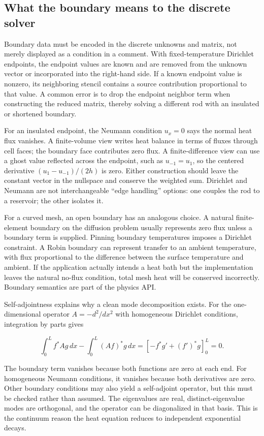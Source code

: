 \subsection{What the boundary means to the discrete solver}\label{02-foundations-ii-ch025-what-the-boundary-means-to-the-discrete-solver}

Boundary data must be encoded in the discrete unknowns and matrix, not merely displayed as a condition in a comment. With fixed-temperature Dirichlet endpoints, the endpoint values are known and are removed from the unknown vector or incorporated into the right-hand side. If a known endpoint value is nonzero, its neighboring stencil contains a source contribution proportional to that value. A common error is to drop the endpoint neighbor term when constructing the reduced matrix, thereby solving a different rod with an insulated or shortened boundary.

For an insulated endpoint, the Neumann condition \(u_x=0\) says the normal heat flux vanishes. A finite-volume view writes heat balance in terms of fluxes through cell faces; the boundary face contributes zero flux. A finite-difference view can use a ghost value reflected across the endpoint, such as \(u_{-1}=u_1\), so the centered derivative \((u_1-u_{-1})/(2h)\) is zero. Either construction should leave the constant vector in the nullspace and conserve the weighted sum. Dirichlet and Neumann are not interchangeable ``edge handling'' options: one couples the rod to a reservoir; the other isolates it.

For a curved mesh, an open boundary has an analogous choice. A natural finite-element boundary on the diffusion problem usually represents zero flux unless a boundary term is supplied. Pinning boundary temperatures imposes a Dirichlet constraint. A Robin boundary can represent transfer to an ambient temperature, with flux proportional to the difference between the surface temperature and ambient. If the application actually intends a heat bath but the implementation leaves the natural no-flux condition, total mesh heat will be conserved incorrectly. Boundary semantics are part of the physics API.

Self-adjointness explains why a clean mode decomposition exists. For the one-dimensional operator \(A=-d^2/dx^2\) with homogeneous Dirichlet conditions, integration by parts gives

\[
\int_0^L f^*Ag\,dx-\int_0^L(Af)^*g\,dx
=\left[-f^*g'+(f')^*g\right]_0^L=0.
\]

The boundary term vanishes because both functions are zero at each end. For homogeneous Neumann conditions, it vanishes because both derivatives are zero. Other boundary conditions may also yield a self-adjoint operator, but this must be checked rather than assumed. The eigenvalues are real, distinct-eigenvalue modes are orthogonal, and the operator can be diagonalized in that basis. This is the continuum reason the heat equation reduces to independent exponential decays.

